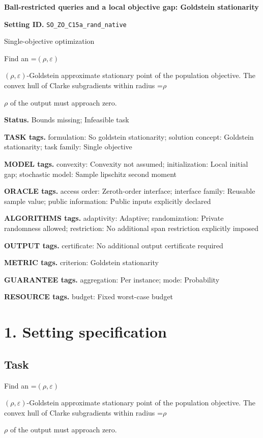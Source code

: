 \documentclass[10pt,a4paper]{article}
\newcommand{\AtlasMath}[1]{\par\begingroup\centering\setbox0=\hbox{$\displaystyle #1$}\ifdim\wd0>1.4\linewidth\typeout{ATLAS WIDE FORMULA: \the\wd0}\fi\ifdim\wd0>\linewidth\resizebox{\linewidth}{!}{\box0}\else\box0\fi\par\endgroup}
\newcommand{\AtlasInlineMath}[1]{\begingroup\setbox0=\hbox{$#1$}\ifdim\wd0>.4\linewidth\endgroup\AtlasMath{#1}\else\endgroup$#1$\fi}
\begin{document}
\raggedright

{\LARGE\bfseries\sffamily\color{AtlasNavy} Ball-restricted queries and a local objective gap: Goldstein stationarity\par}\vspace{5pt}
\textbf{Setting ID.} \texttt{SO\_\allowbreak{}ZO\_\allowbreak{}C15a\_\allowbreak{}rand\_\allowbreak{}native}

Single-objective optimization

Find an \AtlasInlineMath{(\rho,\varepsilon)}-Goldstein approximate stationary point of the population objective. The convex hull of Clarke subgradients within radius \AtlasInlineMath{\rho} of the output must approach zero.

\textbf{Status.} Bounds missing; Infeasible task

\textbf{TASK tags.} formulation: So goldstein stationarity; solution concept: Goldstein stationarity; task family: Single objective

\textbf{MODEL tags.} convexity: Convexity not assumed; initialization: Local initial gap; stochastic model: Sample lipschitz second moment

\textbf{ORACLE tags.} access order: Zeroth-order interface; interface family: Reusable sample value; public information: Public inputs explicitly declared

\textbf{ALGORITHMS tags.} adaptivity: Adaptive; randomization: Private randomness allowed; restriction: No additional span restriction explicitly imposed

\textbf{OUTPUT tags.} certificate: No additional output certificate required

\textbf{METRIC tags.} criterion: Goldstein stationarity

\textbf{GUARANTEE tags.} aggregation: Per instance; mode: Probability

\textbf{RESOURCE tags.} budget: Fixed worst-case budget

\section{1. Setting specification}
\subsection{Task}
Find an \AtlasInlineMath{(\rho,\varepsilon)}-Goldstein approximate stationary point of the population objective. The convex hull of Clarke subgradients within radius \AtlasInlineMath{\rho} of the output must approach zero.
\end{document}
